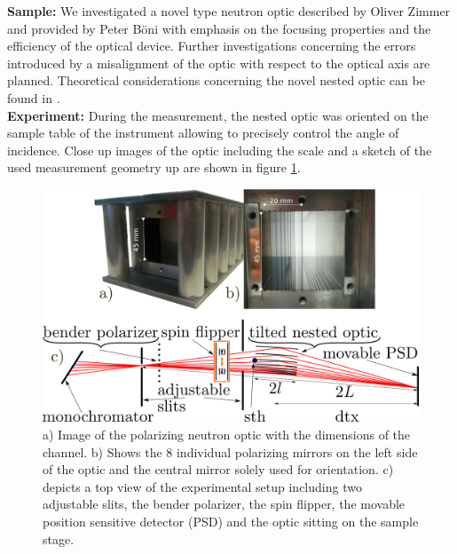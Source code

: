 \documentclass[12pt]{article}
\begin{document}
\noindent
\textbf{Sample:}\newline
We investigated a novel type neutron optic described by Oliver Zimmer \cite{zimmer18} and provided by Peter Böni with emphasis on the focusing properties and the efficiency of the optical device. Further investigations concerning the errors introduced by a misalignment of the optic with respect to the optical axis are planned. Theoretical considerations concerning the novel nested optic can be found in \cite{zimmer16}.\\
\textbf{Experiment:}\newline
During the measurement, the nested optic was oriented on the sample table of the instrument allowing to precisely control the angle of incidence. Close up images of the optic including the scale and a sketch of the used measurement geometry up are shown in figure \ref{fig:theoptic}.\\
\begin{figure}[h]
	\centering
	\includegraphics[width=.56\textwidth]{./figures_report/mirameasboth}
	\caption{a) Image of the polarizing neutron optic with the dimensions of the channel. b) Shows the 8 individual polarizing mirrors on the left side of the optic and the central mirror solely used for orientation. c) depicts a top view of the experimental setup including two adjustable slits, the bender polarizer, the spin flipper, the movable position sensitive detector (PSD) and the optic sitting on the sample stage. }
	\label{fig:theoptic}
\end{figure}
\end{document}
